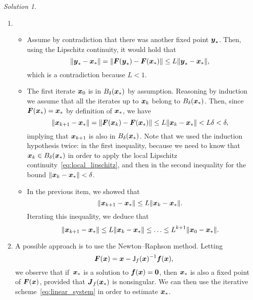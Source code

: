 \documentclass[11pt]{article}
\theoremstyle{definition}
\theoremstyle{remark}
\newtheorem*{solution}{Solution}
\begin{document}
\newpage
\begin{solution}
    $~$
    \begin{enumerate}
        \item {}
            \begin{itemize}

                \item
                    Assume by contradiction that there was another fixed point $\mathbf{\boldsymbol{y}}_*$.
                    Then, using the Lipschitz continuity, it would hold that
                    \[
                        \lVert\mathbf{\boldsymbol{y}}_* - \mathbf{\boldsymbol{x}}_*\rVert = \lVert\mathbf{\boldsymbol{F}}(\mathbf{\boldsymbol{y}}_*) - \mathbf{\boldsymbol{F}}(\mathbf{\boldsymbol{x}}_*)\rVert \leq L \lVert\mathbf{\boldsymbol{y}}_* - \mathbf{\boldsymbol{x}}_*\rVert,
                    \]
                    which is a contradiction because $L < 1$.

                \item
                    The first iterate $\mathbf{\boldsymbol{x}}_0$ is in $B_{\delta}(\mathbf{\boldsymbol{x}}_*)$ by assumption.
                    Reasoning by induction we assume that all the iterates up to $\mathbf{\boldsymbol{x}}_k$ belong to $B_{\delta}(\mathbf{\boldsymbol{x}}_*)$.
                    Then, since $\mathbf{\boldsymbol{F}}(\mathbf{\boldsymbol{x}}_*) = \mathbf{\boldsymbol{x}}_*$ by definition of $\mathbf{\boldsymbol{x}}_*$,
                    we have
                    \[
                        \lVert\mathbf{\boldsymbol{x}}_{k+1} - \mathbf{\boldsymbol{x}}_*\rVert = \lVert\mathbf{\boldsymbol{F}}(\mathbf{\boldsymbol{x}}_{k}) - \mathbf{\boldsymbol{F}}(\mathbf{\boldsymbol{x}}_*)\rVert \leq L \lVert\mathbf{\boldsymbol{x}}_{k} - \mathbf{\boldsymbol{x}}_*\rVert < L \delta < \delta,
                    \]
                    implying that $\mathbf{\boldsymbol{x}}_{k+1}$ is also in $B_{\delta}(\mathbf{\boldsymbol{x}}_*)$.
                    Note that we used the induction hypothesis twice: in the first inequality,
                    because we need to know that $\mathbf{\boldsymbol{x}}_k \in B_{\delta}(\mathbf{\boldsymbol{x}}_*)$ in order to apply the local Lipschitz continuity~\eqref{eq:local_lipschitz},
                    and then in the second inequality for the bound $\lVert\mathbf{\boldsymbol{x}}_{k} - \mathbf{\boldsymbol{x}}_*\rVert < \delta$.

                \item
                    In the previous item, we showed that
                    \[
                        \lVert\mathbf{\boldsymbol{x}}_{k+1} - \mathbf{\boldsymbol{x}}_*\rVert \leq L \lVert\mathbf{\boldsymbol{x}}_{k} - \mathbf{\boldsymbol{x}}_*\rVert.
                    \]
                    Iterating this inequality,
                    we deduce that
                    \[
                        \lVert\mathbf{\boldsymbol{x}}_{k+1} - \mathbf{\boldsymbol{x}}_*\rVert \leq L \lVert\mathbf{\boldsymbol{x}}_{k} - \mathbf{\boldsymbol{x}}_*\rVert \leq \dotsc \leq L^{k+1} \lVert\mathbf{\boldsymbol{x}}_{0} - \mathbf{\boldsymbol{x}}_*\rVert.
                    \]
            \end{itemize}

        \item
            A possible approach is to use the Newton--Raphson method.
            Letting
            \[
                \mathbf{\boldsymbol{F}}(\mathbf{\boldsymbol{x}}) = \mathbf{\boldsymbol{x}} - \mathsf J_{f}(\mathbf{\boldsymbol{x}})^{-1} \mathbf{\boldsymbol{f}}(\mathbf{\boldsymbol{x}}),
            \]
            we observe that if~$\mathbf{\boldsymbol{x}}_*$ is a solution to $\mathbf{\boldsymbol{f}}(\mathbf{\boldsymbol{x}}) = \mathbf{\boldsymbol{0}}$,
            then $\mathbf{\boldsymbol{x}}_*$ is also a fixed point of $\mathbf{\boldsymbol{F}}(\mathbf{\boldsymbol{x}})$,
            provided that $\mathbf{\boldsymbol{J}}_{f}(\mathbf{\boldsymbol{x}}_*)$ is nonsingular.
            We can then use the iterative scheme~\eqref{eq:linear_system} in order to estimate $\mathbf{\boldsymbol{x}}_*$.


\end{enumerate}
\end{solution}
\end{document}
